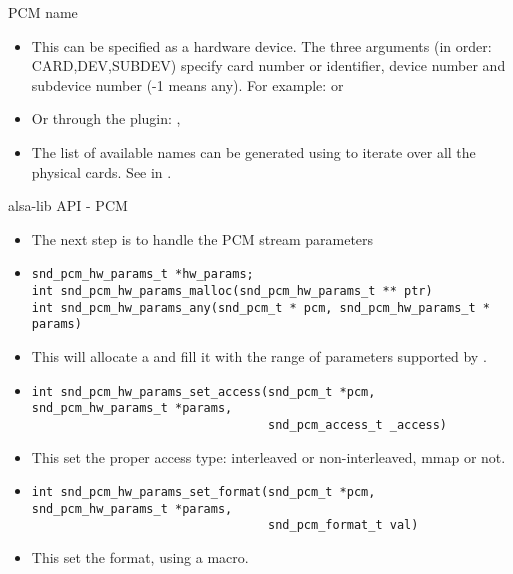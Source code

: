 \begin{frame}{PCM name}
  \begin{itemize}
  \item This can be specified as a hardware device. The three
    arguments (in order: CARD,DEV,SUBDEV) specify card number or
    identifier, device number and subdevice number (-1 means any). For
    example:  or 
  \item Or through the  plugin: ,
  \item The list of available names can be generated using
     to iterate over all the physical cards. See
     in .
  \end{itemize}
\end{frame}

\begin{frame}[fragile]{alsa-lib API - PCM}
  \begin{itemize}
  \item The next step is to handle the PCM stream parameters
  \item
    \begin{block}{}
    \fontsize{9}{9}\selectfont
      \begin{verbatim}
snd_pcm_hw_params_t *hw_params;
int snd_pcm_hw_params_malloc(snd_pcm_hw_params_t ** ptr)
int snd_pcm_hw_params_any(snd_pcm_t * pcm, snd_pcm_hw_params_t * params)
      \end{verbatim}
      \end{block}
    \item This will allocate a  and fill it
      with the range of parameters supported by .
  \item
    \begin{block}{}
    \fontsize{9}{9}\selectfont
      \begin{verbatim}
int snd_pcm_hw_params_set_access(snd_pcm_t *pcm, snd_pcm_hw_params_t *params,
                                 snd_pcm_access_t _access)
      \end{verbatim}
    \end{block}
    \item This set the proper access type: interleaved or
      non-interleaved, mmap or not.
  \item
    \begin{block}{}
    \fontsize{9}{9}\selectfont
      \begin{verbatim}
int snd_pcm_hw_params_set_format(snd_pcm_t *pcm, snd_pcm_hw_params_t *params,
                                 snd_pcm_format_t val)
      \end{verbatim}
    \end{block}
    \item This set the format, using a  macro.
  \end{itemize}
\end{frame}

